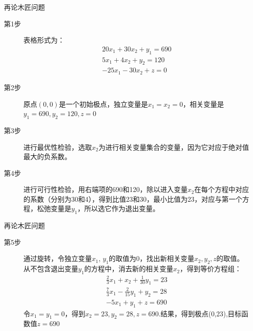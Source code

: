 \documentclass[UTF8]{ctexbeamer}
\begin{document}
\begin{frame}{再论木匠问题}
  \begin{description}
  \item[第1步] 表格形式为：
    \[
    \begin{array}{c}
      20x_1 + 30x_2 + y_1 = 690\\
      5x_1 + 4x_2 + y_2 =  120\\
      -25x_1 - 30x_2 + z = 0
    \end{array}
    \]
  \item[第2步] 原点$(0,0)$是一个初始极点，独立变量是$x_1=x_2=0$，相关变量是$y_1=690, y_2=120, z=0$
  \item[第3步] 进行最优性检验，选取$x_2$为进行相关变量集合的变量，因为它对应于绝对值最大的负系数。
  \item[第4步] 进行可行性检验，用右端项的690和120，除以进入变量$x_2$在每个方程中对应的系数（分别为30和4），得到比值23和30，最小比值为23，对应与第一个方程，松弛变量是$y_1$，所以选它作为退出变量。
  \end{description}

\end{frame}

\begin{frame}{再论木匠问题}
  \begin{description}
  \item[第5步] 通过旋转，令独立变量$x_1$, $y_1$的取值为0，找出新相关变量$x_2, y_2, z$的取值。从不包含退出变量$y_1$的方程中，消去新的相关变量$x_2$，得到等价方程组：
    \[
    \begin{array}{c}
      \frac{2}{3}x_1 + x_2 + \frac{1}{30}y_1 = 23\\
      \frac{7}{3}x_1 - \frac{2}{15}y_1 + y_2 =  28\\
      -5x_1 + y_1 + z = 690
    \end{array}
    \]
    令$x_1=y_1=0$，得到$x_2=23, y_2=28,z=690$.结果，得到极点(0,23),目标函数值$z=690$
  \end{description}
  
\end{frame}
\end{document}
